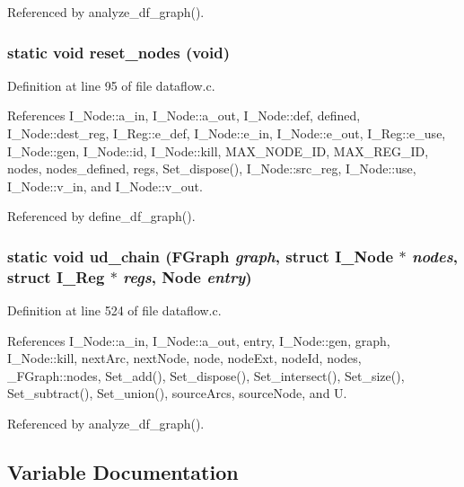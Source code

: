 Referenced by analyze\_\-df\_\-graph().
\subsubsection{\setlength{\rightskip}{0pt plus 5cm}static void reset\_\-nodes (void)\hspace{0.3cm}{\tt  [static]}}\label{dataflow_8c_4e7aefa1bf03f464736cf3d8dd5fceb2}




Definition at line 95 of file dataflow.c.

References I\_\-Node::a\_\-in, I\_\-Node::a\_\-out, I\_\-Node::def, defined, I\_\-Node::dest\_\-reg, I\_\-Reg::e\_\-def, I\_\-Node::e\_\-in, I\_\-Node::e\_\-out, I\_\-Reg::e\_\-use, I\_\-Node::gen, I\_\-Node::id, I\_\-Node::kill, MAX\_\-NODE\_\-ID, MAX\_\-REG\_\-ID, nodes, nodes\_\-defined, regs, Set\_\-dispose(), I\_\-Node::src\_\-reg, I\_\-Node::use, I\_\-Node::v\_\-in, and I\_\-Node::v\_\-out.

Referenced by define\_\-df\_\-graph().
\subsubsection{\setlength{\rightskip}{0pt plus 5cm}static void ud\_\-chain (\bf{FGraph} {\em graph}, struct \bf{I\_\-Node} $\ast$ {\em nodes}, struct \bf{I\_\-Reg} $\ast$ {\em regs}, \bf{Node} {\em entry})\hspace{0.3cm}{\tt  [static]}}\label{dataflow_8c_e760b1d43934b0d277054d53d929bc76}




Definition at line 524 of file dataflow.c.

References I\_\-Node::a\_\-in, I\_\-Node::a\_\-out, entry, I\_\-Node::gen, graph, I\_\-Node::kill, next\-Arc, next\-Node, node, node\-Ext, node\-Id, nodes, \_\-FGraph::nodes, Set\_\-add(), Set\_\-dispose(), Set\_\-intersect(), Set\_\-size(), Set\_\-subtract(), Set\_\-union(), source\-Arcs, source\-Node, and U.

Referenced by analyze\_\-df\_\-graph().

\subsection{Variable Documentation}
